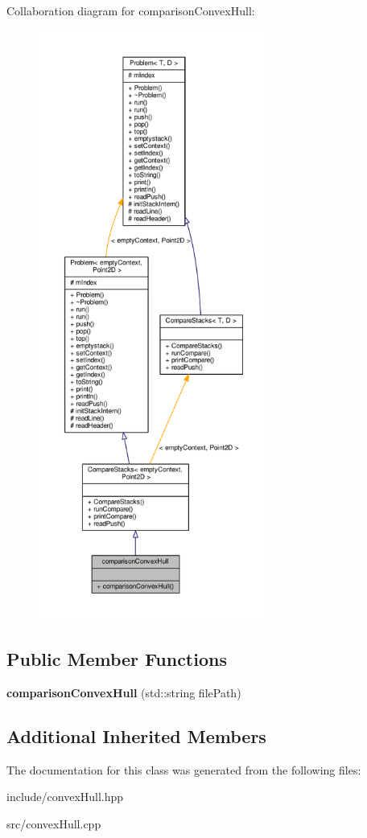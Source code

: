 Collaboration diagram for comparison\+Convex\+Hull\+:
\nopagebreak
\begin{figure}[H]
\begin{center}
\leavevmode
\includegraphics[height=550pt]{classcomparison_convex_hull__coll__graph}
\end{center}
\end{figure}
\subsection*{Public Member Functions}
\begin{DoxyCompactItemize}
\item 
{\bfseries comparison\+Convex\+Hull} (std\+::string file\+Path)\hypertarget{classcomparison_convex_hull_adbb31faac10cca011853284d8e7b021a}{}\label{classcomparison_convex_hull_adbb31faac10cca011853284d8e7b021a}

\end{DoxyCompactItemize}
\subsection*{Additional Inherited Members}


The documentation for this class was generated from the following files\+:\begin{DoxyCompactItemize}
\item 
include/convex\+Hull.\+hpp\item 
src/convex\+Hull.\+cpp\end{DoxyCompactItemize}
